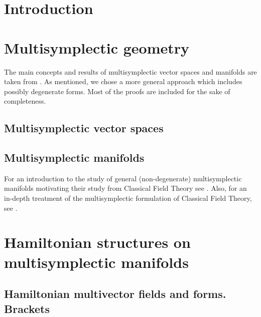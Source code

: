 \documentclass[12pt]{article}
\theoremstyle{definition}
\begin{document}
\section{Introduction}


\section{Multisymplectic geometry}\label{section:MultisymplecticGeometry}
The main concepts and results of multisymplectic vector spaces and manifolds are taken from \cite{Ibort1999OnTG,HamiltonianStructuresIbort,deleon2003tulczyjews}. As mentioned, we chose a more general approach which includes possibly degenerate forms. Most of the proofs are included for the sake of completeness.
\subsection{Multisymplectic vector spaces}\label{Subsection:MultisymplecticVectorSpapces}

\subsection{Multisymplectic manifolds}
For an introduction to the  study of general (non-degenerate) multisymplectic manifolds motivating their study from Classical Field Theory see \cite{Ibort1999OnTG,Invitation2019}. Also, for an in-depth treatment of the multisymplectic formulation of Classical Field Theory, see \cite{ClassicalFieldsSniaiycki,silvia}.



\section{Hamiltonian structures on multisymplectic manifolds}\label{Section:Hamiltonianstructures}
\subsection{Hamiltonian multivector fields and forms. Brackets}

\end{document}
